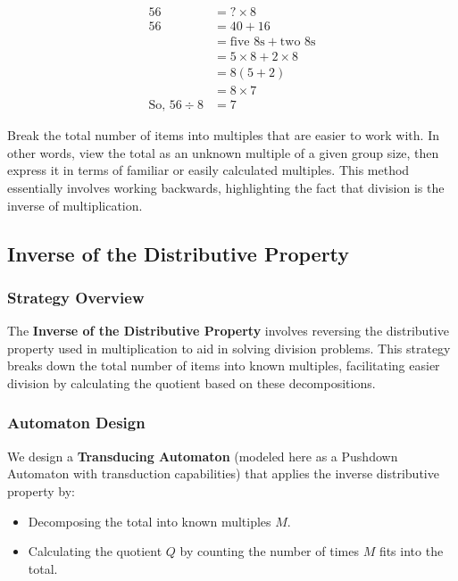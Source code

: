 \documentclass[11pt]{article}
\begin{document}
\begin{align*}
    56 &= ? \times 8\\
    56 &= 40 + 16\\
    &= \text{five }8\text{s} + \text{two }8\text{s}\\
    &= 5\times 8 + 2\times8\\
    &= 8(5 + 2)\\
    &= 8\times7\\
    \text{So, }56 \div 8 &= 7
    \end{align*}


Break the total number of items into multiples that are easier to work with. In other words, view the total as an unknown multiple of a given group size, then express it in terms of familiar or easily calculated multiples. This method essentially involves working backwards, highlighting the fact that division is the inverse of multiplication.
\subsection*{Inverse of the Distributive Property}

\subsubsection*{Strategy Overview}
The \textbf{Inverse of the Distributive Property} involves reversing the distributive property used in multiplication to aid in solving division problems. This strategy breaks down the total number of items into known multiples, facilitating easier division by calculating the quotient based on these decompositions.

\subsubsection*{Automaton Design}
We design a \textbf{Transducing Automaton} (modeled here as a Pushdown Automaton with transduction capabilities) that applies the inverse distributive property by:
\begin{itemize}
    \item Decomposing the total into known multiples \(M\).
    \item Calculating the quotient \(Q\) by counting the number of times \(M\) fits into the total.
\end{itemize}
\end{document}
